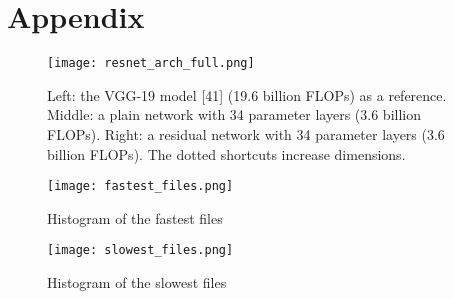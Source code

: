 
\chapter{Appendix}
\begin{figure}[ht]
       \centering 
	    \texttt{[image: resnet\_arch\_full.png]}
        \caption[Example of the architecture of residual networks]{ Left: the VGG-19 model [41] (19.6 billion FLOPs) as a reference. Middle: a plain network with 34 parameter layers (3.6 billion FLOPs). Right: a residual network with 34 parameter layers (3.6 billion FLOPs). The dotted shortcuts increase dimensions.\cite{DBLP:journals/corr/HeZRS15}}
         \label{fig:resnet_arch_full}
\end{figure}
\begin{figure}[ht]
       \centering 
	    \texttt{[image: fastest\_files.png]}
        \caption{Histogram of the fastest files}
         \label{fig:fastest_files_his}
\end{figure}

\begin{figure}[ht]
       \centering 
	    \texttt{[image: slowest\_files.png]}
        \caption{Histogram of the slowest files}
         \label{fig:slowest_files_his}
\end{figure}



